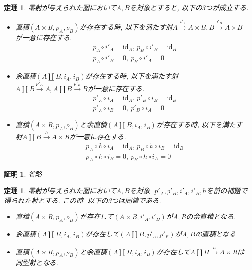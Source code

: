 \documentclass[a4paper,12pt]{ltjsarticle}
\theoremstyle{break}
\newtheorem{thrm}[thm]{定理}
\newtheorem*{prf}{証明}
\newcommand{\xr}[1]{\xrightarrow{#1}}
\newcommand{\id}{\mathrm{id}}
\newcommand{\ci}{\circ}
\newcommand{\ti}{\times}
\newcommand{\am}{\amalg}
\numberwithin{equation}{section}
\begin{document}

\begin{thrm}
  零射が与えられた圏において$A,B$を対象とすると, 以下の3つが成立する. 
  \begin{itemize}
    \item 直積$(A \ti B,p_A,p_B)$が存在する時, 以下を満たす射$A \xr{i'_A} A \ti B, B \xr{i'_B} A \ti B$が一意に存在する. 
    \begin{align*}
      &p_A \ci i'_A = \id_A, ~ p_B \ci i'_B = \id_B \\
      &p_A \ci i'_B = 0, ~ p_B \ci i'_A = 0
    \end{align*}
    \item 余直積$(A \am B,i_A,i_B)$が存在する時, 以下を満たす射$A \am B \xr{p'_A} A,A \am B \xr{p'_B} B$が一意に存在する. 
    \begin{align*}
      &p'_A \ci i_A = \id_A, ~ p'_B \ci i_B = \id_B \\
      &p'_A \ci i_B = 0, ~ p'_B \ci i_A = 0
    \end{align*}
    \item 直積$(A \ti B,p_A,p_B)$と余直積$(A \am B,i_A,i_B)$が存在する時, 以下を満たす射$A \am B \xr{h} A \ti B$が一意に存在する. 
    \begin{align*}
      &p_A \ci h \ci i_A = \id_A, ~ p_B \ci h \ci i_B = \id_B \\
      &p_A \ci h \ci i_B = 0, ~ p_B \ci h \ci i_A = 0
    \end{align*}
  \end{itemize}
\end{thrm}

\begin{prf}
  省略
\end{prf}

\begin{thrm}
  零射が与えられた圏において$A,B$を対象, $p'_A,p'_B,i'_A,i'_B,h$を前の補題で得られた射とする. 
  この時, 以下の3つは同値である.
  \begin{itemize}
    \item 直積$(A \ti B,p_A,p_B)$が存在して$(A \ti B,i'_A, i'_B)$が$A,B$の余直積となる.
    \item 余直積$(A \am B,i_A,i_B)$が存在して$(A \am B,p'_A, p'_B)$が$A,B$の直積となる.
    \item 直積$(A \ti B,p_A,p_B)$と余直積$(A \am B,i_A,i_B)$が存在して$A \am B \xr{h} A \ti B$は同型射となる. 
  \end{itemize} 
\end{thrm}
\end{document}

